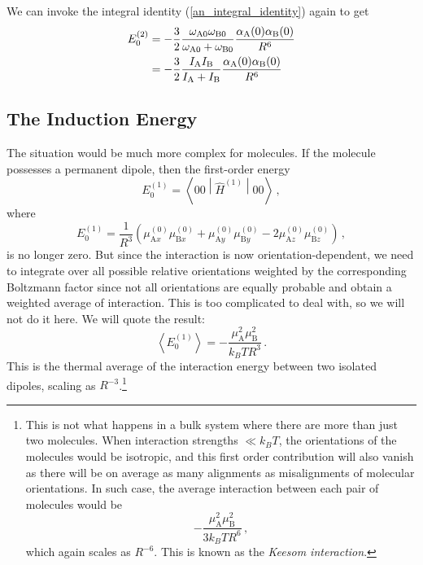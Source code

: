 \documentclass{article}
\theoremstyle{plain}\theoremheaderfont{\normalfont\itshape}\theorembodyfont{\rmfamily}\theoremseparator{.}\newtheorem*{rem}{Remark}\newtheorem*{ex}{Example}\newtheorem*{proof}{Proof}\newtheorem*{altp}{Alternative proof}
\theoremstyle{plain}\theoremheaderfont{\normalfont\bfseries}\theorembodyfont{\rmfamily}\theoremseparator{.}\newtheorem{thm}{Theorem}[section]\newtheorem{lem}[thm]{Lemma}\newtheorem{prop}[thm]{Proposition}\newtheorem*{cor}{Corollary}\newtheorem{defn}[thm]{Definition}\newtheorem{clm}[thm]{Claim}\newtheorem{clminproof}{Claim}
\theoremstyle{break}\theoremheaderfont{\normalfont\itshape}\theorembodyfont{\rmfamily}\theoremseparator{.\medskip}\newtheorem*{proofskip}{Proof}\newtheorem*{exs}{Examples}\newtheorem*{rems}{Remarks}
\theoremstyle{break}\theoremheaderfont{\normalfont\bfseries}\theorembodyfont{\rmfamily}\theoremseparator{.\medskip}\newtheorem{lemskip}[thm]{Lemma}\newtheorem{defnskip}[thm]{Definition}\newtheorem{propskip}[thm]{Proposition}\newtheorem{thmskip}[thm]{Theorem}
\numberwithin{equation}{section}
\newcommand{\eval}[1]{\left\langle #1 \right\rangle}
\newcommand{\expval}[2]{\left\langle #2 \middle| #1 \middle| #2 \right\rangle}
\renewcommand{\AA}{\mathrm{A}}
\newcommand{\BB}{\mathrm{B}}
\begin{document}
    We can invoke the integral identity (\ref{an_integral_identity}) again to get
    \begin{align}
        E_0^{(2)}&=-\frac{3}{2}\frac{\omega_{\AA 0}\omega_{\BB 0}}{\omega_{\AA 0} + \omega_{\BB 0}}\frac{\alpha_{\AA}(0)\alpha_{\BB}(0)}{R^6}\notag\\
        &=-\frac{3}{2}\frac{I_{\AA}I_{\BB}}{I_{\AA} + I_{\BB}}\frac{\alpha_{\AA}(0)\alpha_{\BB}(0)}{R^6}
    \end{align}

    \subsection{The Induction Energy}
    The situation would be much more complex for molecules. If the molecule possesses a permanent dipole, then the first-order energy
    \begin{equation}
        E_0^{(1)}=\expval{\hat{H}^{(1)}}{00}\,,
    \end{equation}
    where
    \begin{equation}
        E_0^{(1)}=\frac{1}{R^3}(\mu_{\AA x}^{(0)}\mu_{\BB x}^{(0)}+\mu_{\AA y}^{(0)}\mu_{\BB y}^{(0)}-2\mu_{\AA z}^{(0)}\mu_{\BB z}^{(0)})\,,
    \end{equation}
    is no longer zero. But since the interaction is now orientation-dependent, we need to integrate over all possible relative orientations weighted by the corresponding Boltzmann factor since not all orientations are equally probable and obtain a weighted average of interaction. This is too complicated to deal with, so we will not do it here. We will quote the result:
    \begin{equation}
        \eval{E_0^{(1)}}=-\frac{\mu_{\AA}^2\mu_{\BB}^2}{k_B TR^3}\,.
    \end{equation}
    This is the thermal average of the interaction energy between two isolated dipoles, scaling as \(R^{-3}\).\footnote{This is not what happens in a bulk system where there are more than just two molecules. When interaction strengths \(\ll k_B T\), the orientations of the molecules would be isotropic, and this first order contribution will also vanish as there will be on average as many alignments as misalignments of molecular orientations. In such case, the average interaction between each pair of molecules would be
    \begin{equation}
        -\frac{\mu_\AA^2\mu_\BB^2}{3k_B T R^6}\,,
    \end{equation}
    which again scales as \(R^{-6}\). This is known as the \textit{Keesom interaction}.}
\end{document}

